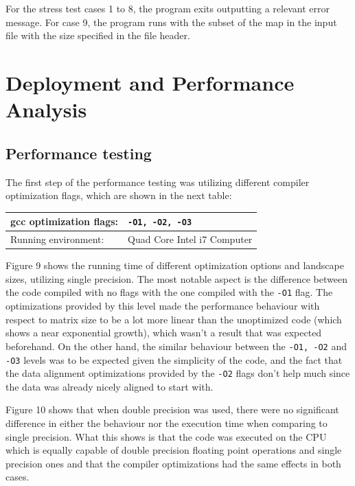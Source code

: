 \documentclass[12pt,a4paper]{article}
\begin{document}
For the stress test cases 1 to 8, the program exits outputting a relevant error message. For case 9, the program runs with the subset of the map in the input file with the size specified in the file header.

\section{Deployment and Performance Analysis}

\subsection{Performance testing} 


The first step of the performance testing was utilizing different compiler optimization flags, which are shown in the next table:

\begin{tabular}{ | l || l | }
    \hline
    gcc optimization flags:  & \texttt{-O1, -O2, -O3} \\
    \hline
    Running environment:  & Quad Core Intel i7 Computer \\
    \hline
\end{tabular}

Figure 9 shows the running time of different optimization options and landscape sizes, utilizing single precision. The most notable aspect is the difference between the code compiled with no flags with the one compiled with the \texttt{-O1} flag. The optimizations provided by this level made the performance behaviour with respect to matrix size to be a lot more linear than the unoptimized code (which shows a near exponential growth), which wasn't a result that was expected beforehand. On the other hand, the similar behaviour between the  \texttt{-O1, -O2} and  \texttt{-O3} levels was to be expected given the simplicity of the code, and the fact that the data alignment optimizations provided by the \texttt{-O2} flags don't help much since the data was already nicely aligned to start with.

Figure 10 shows that when double precision was used, there were no significant difference in either the behaviour nor the execution time when comparing to single precision. What this shows is that the code was executed on the CPU which is equally capable of double precision floating point operations and single precision ones and that the compiler optimizations had the same effects in both cases.
\end{document}
